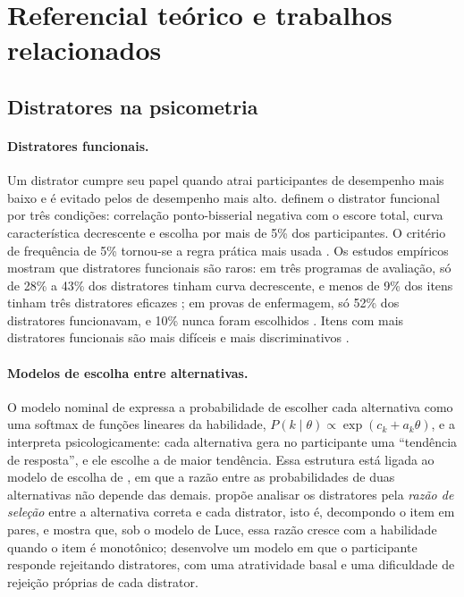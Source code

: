 
\section{Referencial teórico e trabalhos relacionados}\label{sec:referencial}

\subsection{Distratores na psicometria}\label{sec:ref-psicometria}

\paragraph{Distratores funcionais.} Um distrator cumpre seu papel quando atrai participantes de desempenho mais baixo e é evitado pelos de desempenho mais alto. \citet{haladyna1988} definem o distrator funcional por três condições: correlação ponto-bisserial negativa com o escore total, curva característica decrescente e escolha por mais de 5\% dos participantes. O critério de frequência de 5\% tornou-se a regra prática mais usada \citep{haladyna1993,tarrant2009}. Os estudos empíricos mostram que distratores funcionais são raros: em três programas de avaliação, só de 28\% a 43\% dos distratores tinham curva decrescente, e menos de 9\% dos itens tinham três distratores eficazes \citep{haladyna1993}; em provas de enfermagem, só 52\% dos distratores funcionavam, e 10\% nunca foram escolhidos \citep{tarrant2009}. Itens com mais distratores funcionais são mais difíceis e mais discriminativos \citep{haladyna1988,tarrant2009}.

\paragraph{Modelos de escolha entre alternativas.} O modelo nominal de \citet{bock1972} expressa a probabilidade de escolher cada alternativa como uma softmax de funções lineares da habilidade, $P(k \mid \theta) \propto \exp(c_k + a_k\theta)$, e a interpreta psicologicamente: cada alternativa gera no participante uma ``tendência de resposta'', e ele escolhe a de maior tendência. Essa estrutura está ligada ao modelo de escolha de \citet{luce1959}, em que a razão entre as probabilidades de duas alternativas não depende das demais. \citet{love1997} propõe analisar os distratores pela \emph{razão de seleção} entre a alternativa correta e cada distrator, isto é, decompondo o item em pares, e mostra que, sob o modelo de Luce, essa razão cresce com a habilidade quando o item é monotônico; \citet{revuelta2005} desenvolve um modelo em que o participante responde rejeitando distratores, com uma atratividade basal e uma dificuldade de rejeição próprias de cada distrator.

